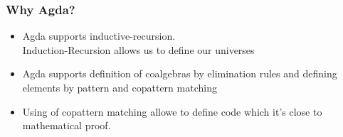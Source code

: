 \documentclass{beamer}
\begin{document}




\begin{frame}
\frametitle{Why Agda?}
\begin{itemize}
 
\item Agda supports inductive-recursion. \\ {\footnotesize Induction-Recursion allows us to define our universes}

\item Agda supports definition of coalgebras by elimination rules and defining elements by pattern and copattern matching

\item Using of copattern matching allowe to define code which it's close to mathematical proof.

\end{itemize}
\end{frame}
\end{document}
